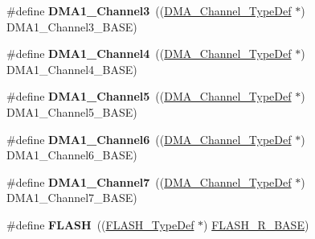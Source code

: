 \begin{DoxyCompactItemize}
\item 
\mbox{\label{group___peripheral__declaration_gacf7b6093a37b306d7f1f50b2f200f0d0}} 
\#define {\bfseries D\+M\+A1\+\_\+\+Channel3}~((\hyperlink{struct_d_m_a___channel___type_def}{D\+M\+A\+\_\+\+Channel\+\_\+\+Type\+Def} $\ast$) D\+M\+A1\+\_\+\+Channel3\+\_\+\+B\+A\+SE)
\item 
\mbox{\label{group___peripheral__declaration_gad2c42743316bf64da557130061b1f56a}} 
\#define {\bfseries D\+M\+A1\+\_\+\+Channel4}~((\hyperlink{struct_d_m_a___channel___type_def}{D\+M\+A\+\_\+\+Channel\+\_\+\+Type\+Def} $\ast$) D\+M\+A1\+\_\+\+Channel4\+\_\+\+B\+A\+SE)
\item 
\mbox{\label{group___peripheral__declaration_ga06ff98ddef3c962795d2e2444004abff}} 
\#define {\bfseries D\+M\+A1\+\_\+\+Channel5}~((\hyperlink{struct_d_m_a___channel___type_def}{D\+M\+A\+\_\+\+Channel\+\_\+\+Type\+Def} $\ast$) D\+M\+A1\+\_\+\+Channel5\+\_\+\+B\+A\+SE)
\item 
\mbox{\label{group___peripheral__declaration_gac013c4376e4797831b5ddd2a09519df8}} 
\#define {\bfseries D\+M\+A1\+\_\+\+Channel6}~((\hyperlink{struct_d_m_a___channel___type_def}{D\+M\+A\+\_\+\+Channel\+\_\+\+Type\+Def} $\ast$) D\+M\+A1\+\_\+\+Channel6\+\_\+\+B\+A\+SE)
\item 
\mbox{\label{group___peripheral__declaration_ga4f9c23b3d1add93ed206b5c9afa5cda3}} 
\#define {\bfseries D\+M\+A1\+\_\+\+Channel7}~((\hyperlink{struct_d_m_a___channel___type_def}{D\+M\+A\+\_\+\+Channel\+\_\+\+Type\+Def} $\ast$) D\+M\+A1\+\_\+\+Channel7\+\_\+\+B\+A\+SE)
\item 
\mbox{\label{group___peripheral__declaration_ga844ea28ba1e0a5a0e497f16b61ea306b}} 
\#define {\bfseries F\+L\+A\+SH}~((\hyperlink{struct_f_l_a_s_h___type_def}{F\+L\+A\+S\+H\+\_\+\+Type\+Def} $\ast$) \hyperlink{group___peripheral__memory__map_ga8e21f4845015730c5731763169ec0e9b}{F\+L\+A\+S\+H\+\_\+\+R\+\_\+\+B\+A\+SE})
\item 
\mbox{\label{group___peripheral__declaration_gad2d5f875cdc6d696735f20fa23a895c3}} 

\end{DoxyCompactItemize}
